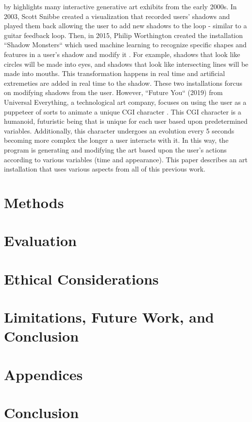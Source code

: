\documentclass[10pt,twocolumn]{article}
\begin{document}
 by \citeauthor{kwon_real-time_nodate} highlights many interactive generative art exhibits from the early 2000s. In 2003, Scott Snibbe created a visualization that recorded users' shadows and played them back allowing the user to add new shadows to the loop - similar to a guitar feedback loop.  Then, in 2015, Philip Worthington created the installation ``Shadow Monsters`` which used machine learning to recognize specific shapes and features in a user's shadow and modify it \cite{houston_public_media_mfah_2015}.  For example, shadows that look like circles will be made into eyes, and shadows that look like intersecting lines will be made into mouths.  This transformation happens in real time and artificial extremeties are added in real time to the shadow. These two installations forcus on modifying shadows from the user. However, ``Future You`` (2019) from Universal Everything, a technological art company, focuses on using the user as a puppeteer of sorts to animate a unique CGI character \cite{noauthor_future_2019}. This CGI character is a humanoid, futuristic being that is unique for each user based upon predetermined variables. Additionally, this character undergoes an evolution every 5 seconds becoming more complex the longer a user interacts with it.  In this way, the program is generating and modifying the art based upon the user's actions according to various variables (time and appearance).  This paper describes an art installation that uses various aspects from all of this previous work. 


\section{Methods}

\section{Evaluation}

\section{Ethical Considerations}

\section{Limitations, Future Work, and Conclusion}

\section{Appendices}

\section{Conclusion}

\printbibliography 
\end{document}
